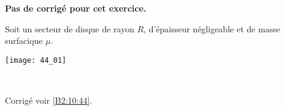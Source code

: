 \normaltrue \difficilefalse \tdifficilefalse
\correctionfalse


\setcounter{numques}{0}
\ifcorrection
\else
\textbf{Pas de corrigé pour cet exercice.}
\fi




\ifprof
\else
Soit un secteur de disque de rayon $R$, d'épaisseur négligeable et de masse surfacique $\mu$. 
\begin{marginfigure}
\centering
\texttt{[image: 44\_01]}
\end{marginfigure}
\fi


\ifprof
\else
\fi

\ifprof ~\\
\else
\fi


\ifprof
\else
\begin{flushright}
\footnotesize{Corrigé voir \ref{B2:10:44}.}
\end{flushright}%
\fi